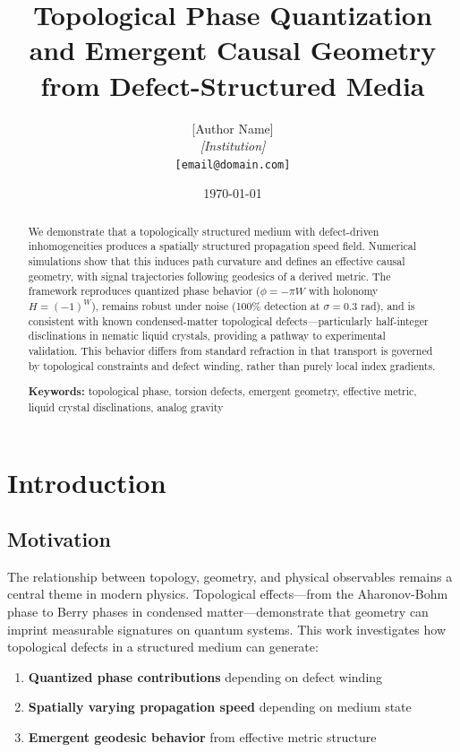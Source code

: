 \documentclass[11pt,a4paper]{article}
\title{\textbf{Topological Phase Quantization and Emergent Causal Geometry\\from Defect-Structured Media}}
\author{[Author Name]\\
\textit{[Institution]}\\
\texttt{[email@domain.com]}}
\date{\today}
\begin{document}
\maketitle

\begin{abstract}
We demonstrate that a topologically structured medium with defect-driven inhomogeneities produces a spatially structured propagation speed field. Numerical simulations show that this induces path curvature and defines an effective causal geometry, with signal trajectories following geodesics of a derived metric. The framework reproduces quantized phase behavior ($\phi = -\pi W$ with holonomy $H = (-1)^W$), remains robust under noise (100\% detection at $\sigma = 0.3$ rad), and is consistent with known condensed-matter topological defects---particularly half-integer disclinations in nematic liquid crystals, providing a pathway to experimental validation. This behavior differs from standard refraction in that transport is governed by topological constraints and defect winding, rather than purely local index gradients.

\vspace{0.5em}
\noindent\textbf{Keywords:} topological phase, torsion defects, emergent geometry, effective metric, liquid crystal disclinations, analog gravity
\end{abstract}

\section{Introduction}

\subsection{Motivation}

The relationship between topology, geometry, and physical observables remains a central theme in modern physics. Topological effects---from the Aharonov-Bohm phase to Berry phases in condensed matter---demonstrate that geometry can imprint measurable signatures on quantum systems. This work investigates how topological defects in a structured medium can generate:

\begin{enumerate}
    \item \textbf{Quantized phase contributions} depending on defect winding
    \item \textbf{Spatially varying propagation speed} depending on medium state
    \item \textbf{Emergent geodesic behavior} from effective metric structure
\end{enumerate}
\end{document}
